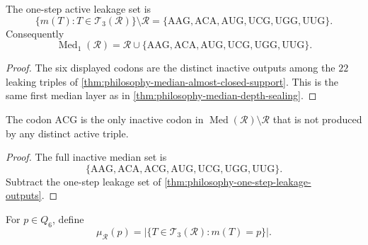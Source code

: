 \begin{theorem}
\label{thm:philosophy-one-step-leakage-outputs}
The one-step active leakage set is
$$
  \{m(T):T\in\mathcal{T}_{3}(\mathcal{R})\}
  \setminus\mathcal{R}
  =
  \{\mathrm{AAG},\mathrm{ACA},\mathrm{AUG},
    \mathrm{UCG},\mathrm{UGG},\mathrm{UUG}\}.
$$
Consequently
$$
  \operatorname{Med}_{1}(\mathcal{R})
  =
  \mathcal{R}\cup
  \{\mathrm{AAG},\mathrm{ACA},\mathrm{AUG},
    \mathrm{UCG},\mathrm{UGG},\mathrm{UUG}\}.
$$
\end{theorem}
\begin{proof}
The six displayed codons are the distinct inactive outputs among the
$22$ leaking triples of
\autoref{thm:philosophy-median-almost-closed-support}. This is the same
first median layer as in
\autoref{thm:philosophy-median-depth-sealing}.
\end{proof}

\begin{corollary}
\label{cor:philosophy-acg-not-direct-leakage}
The codon $\mathrm{ACG}$ is the only inactive codon in
$\operatorname{Med}(\mathcal{R})\setminus\mathcal{R}$ that is not
produced by any distinct active triple.
\end{corollary}
\begin{proof}
The full inactive median set is
$$
  \{\mathrm{AAG},\mathrm{ACA},\mathrm{ACG},\mathrm{AUG},
    \mathrm{UCG},\mathrm{UGG},\mathrm{UUG}\}.
$$
Subtract the one-step leakage set of
\autoref{thm:philosophy-one-step-leakage-outputs}.
\end{proof}

\begin{definition}
\label{def:philosophy-median-centrality}
For $p\in Q_{6}$, define
$$
  \mu_{\mathcal{R}}(p)
  =
  |\{T\in\mathcal{T}_{3}(\mathcal{R}):m(T)=p\}|.
$$
\end{definition}

